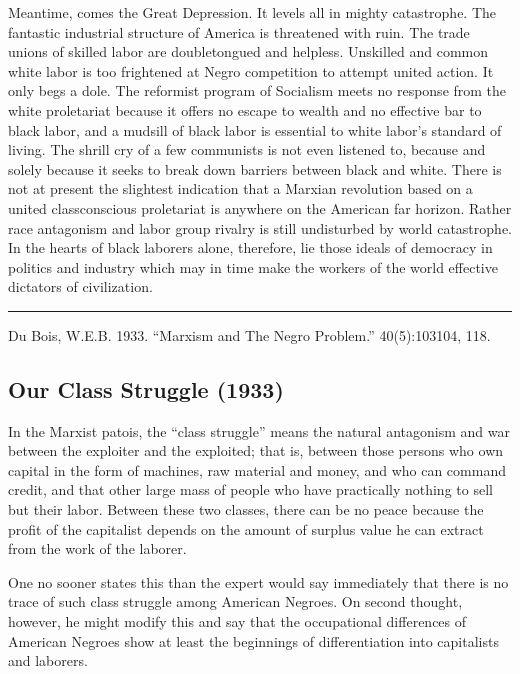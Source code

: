 \documentclass[letterpaper,10pt,english]{jupyterBook}
\begin{document}
\sphinxAtStartPar
Meantime, comes the Great Depression. It levels all in mighty catastrophe. The fantastic industrial structure of America is threatened with ruin. The trade unions of skilled labor are double\sphinxhyphen{}tongued and helpless. Unskilled and common white labor is too frightened at Negro competition to attempt united action. It only begs a dole. The reformist program of Socialism meets no response from the white proletariat because it offers no escape to wealth and no effective bar to black labor, and a mud\sphinxhyphen{}sill of black labor is essential to white labor’s standard of living. The shrill cry of a few communists is not even listened to, because and solely because it seeks to break down barriers between black and white. There is not at present the slightest indication that a Marxian revolution based on a united class\sphinxhyphen{}conscious proletariat is anywhere on the American far horizon. Rather race antagonism and labor group rivalry is still undisturbed by world catastrophe. In the hearts of black laborers alone, therefore, lie those ideals of democracy in politics and industry which may in time make the workers of the world effective dictators of civilization.


\bigskip\hrule\bigskip


\sphinxAtStartPar
{} Du Bois, W.E.B. 1933. “Marxism and The Negro Problem.”  40(5):103\sphinxhyphen{}104, 118.


\subsection{Our Class Struggle (1933)}
\label{\detokenize{Volumes/40/07/our_class_struggle:our-class-struggle-1933}}\label{\detokenize{Volumes/40/07/our_class_struggle::doc}}
\sphinxAtStartPar
In the Marxist patois, the “class struggle” means the natural antagonism and war between the exploiter and the exploited; that is, between those persons who own capital in the form of machines, raw material and money, and who can command credit, and that other large mass of people who have practically nothing to sell but their labor. Between these two classes, there can be no peace because the profit of the capitalist depends on the amount of surplus value he can extract from the work of the laborer.

\sphinxAtStartPar
One no sooner states this than the expert would say immediately that there is no trace of such class struggle among American Negroes. On second thought, however, he might modify this and say that the occupational differences of American Negroes show at least the beginnings of differentiation into capitalists and laborers.
\end{document}
